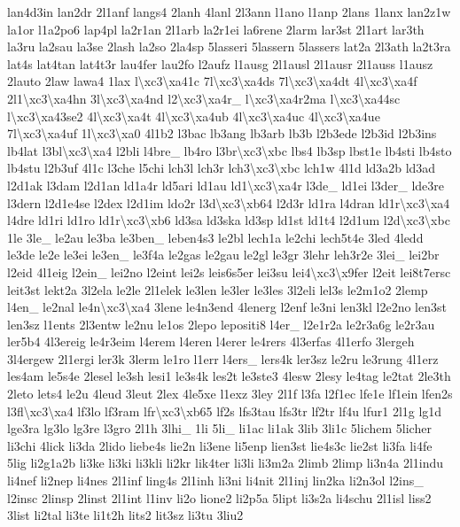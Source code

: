 {lan4d3in lan2dr 2l1anf langs4 2lanh 4lanl 2l3ann l1ano l1anp 2lans 1lanx lan2z1w la1or l1a2po6 lap4pl la2r1an 2l1arb la2r1ei la6rene 2larm lar3st 2l1art lar3th la3ru la2sau la3se 2lash la2so 2la4sp 5lasseri 5lassern 5lassers lat2a 2l3ath la2t3ra lat4s lat4tan lat4t3r lau4fer lau2fo l2aufz l1ausg 2l1ausl 2l1ausr 2l1auss l1ausz 2lauto 2law lawa4 1lax l\textbackslash{}xc3\textbackslash{}xa41c 7l\textbackslash{}xc3\textbackslash{}xa4ds 7l\textbackslash{}xc3\textbackslash{}xa4dt 4l\textbackslash{}xc3\textbackslash{}xa4f 2l1\textbackslash{}xc3\textbackslash{}xa4hn 3l\textbackslash{}xc3\textbackslash{}xa4nd l2\textbackslash{}xc3\textbackslash{}xa4r\-\_\- l\textbackslash{}xc3\textbackslash{}xa4r2ma l\textbackslash{}xc3\textbackslash{}xa44sc l\textbackslash{}xc3\textbackslash{}xa43se2 4l\textbackslash{}xc3\textbackslash{}xa4t 4l\textbackslash{}xc3\textbackslash{}xa4ub 4l\textbackslash{}xc3\textbackslash{}xa4uc 4l\textbackslash{}xc3\textbackslash{}xa4ue 7l\textbackslash{}xc3\textbackslash{}xa4uf 1l\textbackslash{}xc3\textbackslash{}xa0 4l1b2 l3bac lb3ang lb3arb lb3b l2b3ede l2b3id l2b3ins lb4lat l3bl\textbackslash{}xc3\textbackslash{}xa4 l2bli l4bre\-\_\- lb4ro l3br\textbackslash{}xc3\textbackslash{}xbc lbs4 lb3sp lbst1e lb4sti lb4sto lb4stu l2b3uf 4l1c l3che l5chi lch3l lch3r lch3\textbackslash{}xc3\textbackslash{}xbc lch1w 4l1d ld3a2b ld3ad l2d1ak l3dam l2d1an ld1a4r ld5ari ld1au ld1\textbackslash{}xc3\textbackslash{}xa4r l3de\-\_\- ld1ei l3der\-\_\- lde3re l3dern l2d1e4se l2dex l2d1im ldo2r l3d\textbackslash{}xc3\textbackslash{}xb64 l2d3r ld1ra l4dran ld1r\textbackslash{}xc3\textbackslash{}xa4 l4dre ld1ri ld1ro ld1r\textbackslash{}xc3\textbackslash{}xb6 ld3sa ld3ska ld3sp ld1st ld1t4 l2d1um l2d\textbackslash{}xc3\textbackslash{}xbc 1le 3le\-\_\- le2au le3ba le3ben\-\_\- leben4s3 le2bl lech1a le2chi lech5t4e 3led 4ledd le3de le2e le3ei le3en\-\_\- le3f4a le2gas le2gau le2gl le3gr 3lehr leh3r2e 3lei\-\_\- lei2br l2eid 4l1eig l2ein\-\_\- lei2no l2eint lei2s leis6s5er lei3su lei4\textbackslash{}xc3\textbackslash{}x9fer l2eit lei8t7ersc leit3st lekt2a 3l2ela le2le 2l1elek le3len le3ler le3les 3l2eli lel3s le2m1o2 2lemp l4en\-\_\- le2nal le4n\textbackslash{}xc3\textbackslash{}xa4 3lene le4n3end 4lenerg l2enf le3ni len3kl l2e2no len3st len3sz l1ents 2l3entw le2nu le1os 2lepo lepositi8 l4er\-\_\- l2e1r2a le2r3a6g le2r3au ler5b4 4l3ereig le4r3eim l4erem l4eren l4erer le4rers 4l3erfas 4l1erfo 3lergeh 3l4ergew 2l1ergi ler3k 3lerm le1ro l1err l4ers\-\_\- lers4k ler3sz le2ru le3rung 4l1erz les4am le5s4e 2lesel le3sh lesi1 le3s4k les2t le3ste3 4lesw 2lesy le4tag le2tat 2le3th 2leto lets4 le2u 4leud 3leut 2lex 4le5xe l1exz 3ley 2l1f l3fa l2f1ec lfe1e lf1ein lfen2s l3fl\textbackslash{}xc3\textbackslash{}xa4 lf3lo lf3ram lfr\textbackslash{}xc3\textbackslash{}xb65 lf2s lfs3tau lfs3tr lf2tr lf4u lfur1 2l1g lg1d lge3ra lg3lo lg3re l3gro 2l1h 3lhi\-\_\- 1li 5li\-\_\- li1ac li1ak 3lib 3li1c 5lichem 5licher li3chi 4lick li3da 2lido liebe4s lie2n li3ene li5enp lien3st lie4s3c lie2st li3fa li4fe 5lig li2g1a2b li3ke li3ki li3kli li2kr lik4ter li3li li3m2a 2limb 2limp li3n4a 2l1indu li4nef li2nep li4nes 2l1inf ling4s 2l1inh li3ni li4nit 2l1inj lin2ka li2n3ol l2ins\-\_\- l2insc 2linsp 2linst 2l1int l1inv li2o lione2 li2p5a 5lipt li3s2a li4schu 2l1isl liss2 3list li2tal li3te li1t2h lits2 lit3sz li3tu 3liu2 }
